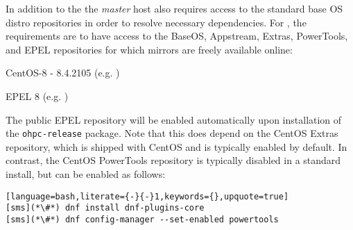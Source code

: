 In addition to the \OHPC{} 
\iftoggle{isxCAT}{and \xCAT{} package repositories,}{package repository,}
the {\em master} host also requires access to the standard base OS distro
repositories in order to resolve necessary dependencies. For \baseOS{}, the
requirements are to have access to the BaseOS, Appstream, Extras, PowerTools,
and EPEL repositories for which mirrors are freely available online:

\begin{itemize*}
\item CentOS-8 - 8.4.2105
  (e.g. \href{http://mirror.centos.org/centos-8/8/}
             {\color{blue}{http://mirror.centos.org/centos-8/8/}} )
\item EPEL 8 (e.g. \href{http://download.fedoraproject.org/pub/epel/8/}
                        {\color{blue}{http://download.fedoraproject.org/pub/epel/8/}} )
\end{itemize*}

\noindent The public EPEL repository will be enabled automatically upon
installation of the \texttt{ohpc-release} package. Note that this does depend
on the CentOS Extras repository, which is shipped with CentOS and is typically
enabled by default.  In contrast, the CentOS PowerTools repository is typically
disabled in a standard install, but can be enabled as follows:

\begin{lstlisting}[language=bash,literate={-}{-}1,keywords={},upquote=true]
[sms](*\#*) dnf install dnf-plugins-core
[sms](*\#*) dnf config-manager --set-enabled powertools
\end{lstlisting}
